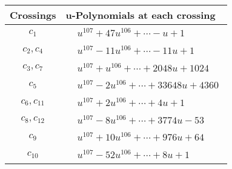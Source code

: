 \documentclass[1p]{elsarticle_modified}
\theoremstyle{definition}
\begin{document}
\begin{tabular}{m{50pt}|m{274pt}}
Crossings & \hspace{64pt}u-Polynomials at each crossing \\
\hline $$\begin{aligned}c_{1}\end{aligned}$$&$\begin{aligned}
&u^{107}+47 u^{106}+\cdots- u+1
\end{aligned}$\\
\hline $$\begin{aligned}c_{2},c_{4}\end{aligned}$$&$\begin{aligned}
&u^{107}-11 u^{106}+\cdots-11 u+1
\end{aligned}$\\
\hline $$\begin{aligned}c_{3},c_{7}\end{aligned}$$&$\begin{aligned}
&u^{107}+u^{106}+\cdots+2048 u+1024
\end{aligned}$\\
\hline $$\begin{aligned}c_{5}\end{aligned}$$&$\begin{aligned}
&u^{107}-2 u^{106}+\cdots+33648 u+4360
\end{aligned}$\\
\hline $$\begin{aligned}c_{6},c_{11}\end{aligned}$$&$\begin{aligned}
&u^{107}+2 u^{106}+\cdots+4 u+1
\end{aligned}$\\
\hline $$\begin{aligned}c_{8},c_{12}\end{aligned}$$&$\begin{aligned}
&u^{107}-8 u^{106}+\cdots+3774 u-53
\end{aligned}$\\
\hline $$\begin{aligned}c_{9}\end{aligned}$$&$\begin{aligned}
&u^{107}+10 u^{106}+\cdots+976 u+64
\end{aligned}$\\
\hline $$\begin{aligned}c_{10}\end{aligned}$$&$\begin{aligned}
&u^{107}-52 u^{106}+\cdots+8 u+1
\end{aligned}$\\
\hline
\end{tabular}\\~\\
\end{document}
